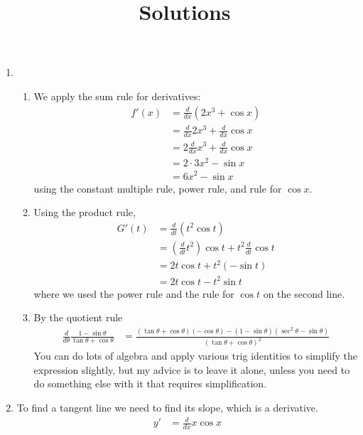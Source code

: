 \documentclass{article}
\title{\commonPSTitleZeroTwoFour\ Solutions}
\author{\commonAuthor}
\date{\commonDateZeroTwoFour}
\begin{document}
\maketitle
\begin{enumerate}
\item %
  \begin{enumerate}
  \item %
    We apply the sum rule for derivatives:
    \begin{align*}
      f'(x) &= \frac{d}{dx} (2x^3 + \cos x)
      \\
            &= \frac{d}{dx} 2x^3 + \frac{d}{dx} \cos x
      \\
            &= 2 \frac{d}{dx} x^3 + \frac{d}{dx} \cos x
      \\
            &= 2 \cdot 3 x^2 - \sin x
      \\
            &= 6 x^2 - \sin x
    \end{align*}
    using the constant multiple rule, power rule, and rule for $\cos
    x$. 
  \item %
    Using the product rule,
    \begin{align*}
      G'(t) &= \frac{d}{dt} (t^2 \cos t)
      \\
            &= \left(\frac{d}{dt} t^2\right) \cos t
              + t^2 \frac{d}{dt} \cos t
      \\
            &= 2t \cos t + t^2 (-\sin t)
      \\
            &= 2t \cos t - t^2 \sin t
    \end{align*}
    where we used the power rule and the rule for $\cos t$ on the
    second line.
  \item %
    By the quotient rule
    \begin{align*}
      \frac{d}{d\theta} \frac{1-\sin\theta}{\tan\theta+\cos\theta}
      &= \frac{(\tan\theta+\cos\theta)(-\cos\theta) -
        (1-\sin\theta)(\sec^2\theta-\sin\theta)}{
        (\tan\theta+\cos\theta)^2}
    \end{align*}
    You can do lots of algebra and apply various trig identities to
    simplify the expression slightly, but my advice is to leave it
    alone, unless you need to do something else with it that requires
    simplification.
  \end{enumerate}
\item %
  To find a tangent line we need to find its slope, which is a derivative.
  \begin{align*}
    y' &= \frac{d}{dx} x \cos x

\end{align*}
\end{enumerate}
\end{document}
